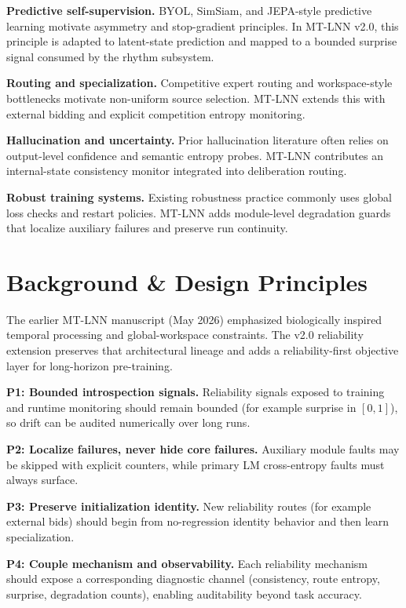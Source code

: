 \documentclass[10pt,twocolumn]{article}
\begin{document}
\textbf{Predictive self-supervision.} BYOL, SimSiam, and JEPA-style predictive learning motivate asymmetry and stop-gradient principles. In MT-LNN v2.0, this principle is adapted to latent-state prediction and mapped to a bounded surprise signal consumed by the rhythm subsystem.

\textbf{Routing and specialization.} Competitive expert routing and workspace-style bottlenecks motivate non-uniform source selection. MT-LNN extends this with external bidding and explicit competition entropy monitoring.

\textbf{Hallucination and uncertainty.} Prior hallucination literature often relies on output-level confidence and semantic entropy probes. MT-LNN contributes an internal-state consistency monitor integrated into deliberation routing.

\textbf{Robust training systems.} Existing robustness practice commonly uses global loss checks and restart policies. MT-LNN adds module-level degradation guards that localize auxiliary failures and preserve run continuity.

\section{Background \& Design Principles}
The earlier MT-LNN manuscript (May 2026) emphasized biologically inspired temporal processing and global-workspace constraints. The v2.0 reliability extension preserves that architectural lineage and adds a reliability-first objective layer for long-horizon pre-training.

\textbf{P1: Bounded introspection signals.} Reliability signals exposed to training and runtime monitoring should remain bounded (for example surprise in $[0,1]$), so drift can be audited numerically over long runs.

\textbf{P2: Localize failures, never hide core failures.} Auxiliary module faults may be skipped with explicit counters, while primary LM cross-entropy faults must always surface.

\textbf{P3: Preserve initialization identity.} New reliability routes (for example external bids) should begin from no-regression identity behavior and then learn specialization.

\textbf{P4: Couple mechanism and observability.} Each reliability mechanism should expose a corresponding diagnostic channel (consistency, route entropy, surprise, degradation counts), enabling auditability beyond task accuracy.
\end{document}
